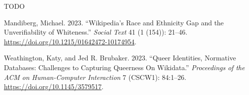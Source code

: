 \documentclass[
  a4paper,
  DIV=11,
  numbers=noendperiod]{scrreprt}
\newlength{\cslhangindent}
\newlength{\cslentryspacingunit} %
\newenvironment{CSLReferences}[2] %
 {%
  \setlength{\parindent}{0pt}
  \ifodd #1
  \let\oldpar\par
  \def\par{\hangindent=\cslhangindent\oldpar}
  \fi
  \setlength{\parskip}{#2\cslentryspacingunit}
 }%
 {}
\begin{document}
TODO

\hypertarget{refs}{}
\begin{CSLReferences}{1}{0}
\leavevmode{}%
Mandiberg, Michael. 2023. {``Wikipedia's {Race} and {Ethnicity} {Gap}
and the {Unverifiability} of {Whiteness}.''} \emph{Social Text} 41 (1
(154)): 21--46. \url{https://doi.org/10.1215/01642472-10174954}.

\leavevmode{}%
Weathington, Katy, and Jed R. Brubaker. 2023. {``Queer {Identities},
{Normative} {Databases}: {Challenges} to {Capturing} {Queerness} {On}
{Wikidata}.''} \emph{Proceedings of the ACM on Human-Computer
Interaction} 7 (CSCW1): 84:1--26. \url{https://doi.org/10.1145/3579517}.

\end{CSLReferences}
\end{document}
